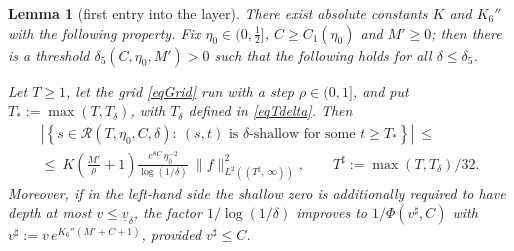 \documentclass[11pt,twoside,reqno]{amsart}
\def\RR{{\mathcal{R}}}
\def\d{\delta}
\def\uv{\underline{v}_{\d}}
\theoremstyle{plain}
\newtheorem{lemma}{Lemma}
\numberwithin{equation}{section}
\begin{document}
\begin{lemma}[first entry into the layer]\label{lemShallow}
There exist absolute constants $K$ and $K_6''$ with the following property. Fix $\eta_0\in(0,\tfrac12]$, $C\geq C_1(\eta_0)$ and $M'\geq0$; then there is a threshold $\d_5(C,\eta_0,M')>0$ such that the following holds for all $\d\leq\d_5$.

Let $T\geq1$, let the grid \eqref{eqGrid} run with a step $\rho\in(0,1]$, and put $T_*:=\max(T,T_\d)$, with $T_\d$ defined in \eqref{eqTdelta}. Then
\begin{equation}
\begin{gathered}
\left|\left\{s\in\RR(T,\eta_0,C,\d):\ (s,t)\text{ is $\d$-shallow for some }t\geq T_*\right\}\right|\ \leq\\
\leq\ K\left(\frac{M'}\rho+1\right)\frac{e^{8C}\,\eta_0^{-2}}{\log(1/\d)}\ \|f\|^2_{L^2((T^\sharp,\,\infty))},\qquad T^\sharp:=\max(T,T_\d)/32 .
\end{gathered}
\label{eqShallowSet}
\end{equation}
Moreover, if in the left-hand side the shallow zero is additionally required to have depth at most $v\leq\uv$, the factor $1/\log(1/\d)$ improves to $1/\Phi(v^\sharp,C)$ with $v^\sharp:=v\,e^{K_6''(M'+C+1)}$, provided $v^\sharp\leq C$.
\end{lemma}
\end{document}
